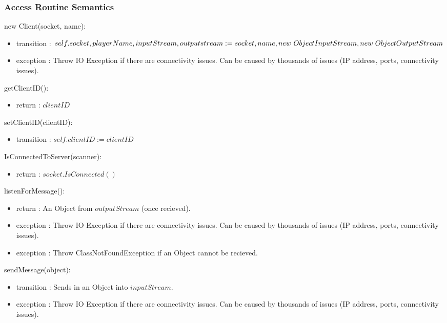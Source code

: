 \documentclass[12pt, titlepage]{article}
\begin{document}
    \subsubsection* {Access Routine Semantics}
    
        \noindent new Client(socket, name):
        \begin{itemize}
        \item transition : $self.socket, playerName, inputStream, outputstream := \\ socket, name, new \hspace{3px} ObjectInputStream, new \hspace{3px} ObjectOutputStream$
        \item exception : Throw IO Exception if there are connectivity issues. Can be caused by thousands of issues (IP address, ports, connectivity issues).
        \end{itemize}
        
        \noindent getClientID():
        \begin{itemize}
        \item return : $clientID$
        \end{itemize}
        
        \noindent setClientID(clientID):
        \begin{itemize}
        \item transition : $self.clientID := clientID$
        \end{itemize}
        
        \noindent IsConnectedToServer(scanner):
        \begin{itemize}
        \item return : $socket.IsConnected()$
        \end{itemize}
        
        \noindent listenForMessage():
        \begin{itemize}
        \item return : An Object from $outputStream$ (once recieved).
        \item exception : Throw IO Exception if there are connectivity issues. Can be caused by thousands of issues (IP address, ports, connectivity issues).
        \item exception : Throw ClassNotFoundException if an Object cannot be recieved.
        \end{itemize}
        
        \noindent sendMessage(object):
        \begin{itemize}
        \item transition : Sends in an Object into $inputStream$.
        \item exception : Throw IO Exception if there are connectivity issues. Can be caused by thousands of issues (IP address, ports, connectivity issues).
        \end{itemize}
        
\end{document}
